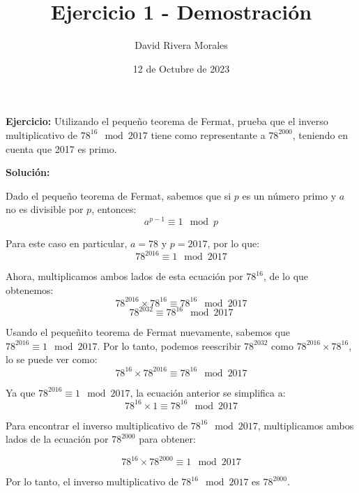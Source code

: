 \documentclass[12pt,a4paper]{article}
\begin{document}
\title{Ejercicio 1 - Demostración}
\author{David Rivera Morales}
\date{12 de Octubre de 2023}

\maketitle

\textbf{Ejercicio:} Utilizando el pequeño teorema de Fermat, prueba que el inverso multiplicativo de $78^{16} \mod 2017$ tiene como representante a $78^{2000}$, teniendo en cuenta que 2017 es primo.

\textbf{Solución:}

Dado el pequeño teorema de Fermat, sabemos que si \( p \) es un número primo y \( a \) no es divisible por \( p \), entonces:
\[ a^{p-1} \equiv 1 \mod p \]

Para este caso en particular, \( a = 78 \) y \( p = 2017 \), por lo que:
\[ 78^{2016} \equiv 1 \mod 2017 \]

Ahora, multiplicamos ambos lados de esta ecuación por \( 78^{16} \), de lo que obtenemos:
\[ 78^{2016} \times 78^{16} \equiv 78^{16} \mod 2017 \]
\[ 78^{2032} \equiv 78^{16} \mod 2017 \]

Usando el pequeñito teorema de Fermat nuevamente, sabemos que \( 78^{2016} \equiv 1 \mod 2017 \). Por lo tanto, podemos reescribir \( 78^{2032} \) como \( 78^{2016} \times 78^{16} \), lo se puede ver como:
\[ 78^{16} \times 78^{2016} \equiv 78^{16} \mod 2017 \]

Ya que \( 78^{2016} \equiv 1 \mod 2017 \), la ecuación anterior se simplifica a:
\[ 78^{16} \times 1 \equiv 78^{16} \mod 2017 \]

Para encontrar el inverso multiplicativo de \( 78^{16} \mod 2017 \), multiplicamos ambos lados de la ecuación por \( 78^{2000} \) para obtener:

\[ 78^{16} \times 78^{2000} \equiv 1 \mod 2017 \] 

Por lo tanto, el inverso multiplicativo de \( 78^{16} \mod 2017 \) es \( 78^{2000} \).
\end{document}
